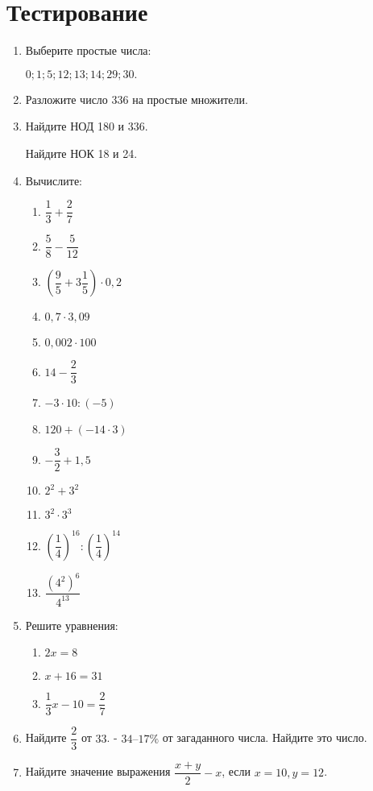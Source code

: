 \documentclass[12pt, a4paper]{article}
\begin{document}
	
	\section*{Тестирование}
	\begin{enumerate}
		\item Выберите простые числа:
		
		$0; 1; 5; 12; 13; 14; 29; 30. $
		\item Разложите число 336 на простые множители.
		\item Найдите НОД 180 и 336.
		
		Найдите НОК 18 и 24.
		\item Вычислите:
		\begin{multicols}{2}
			\begin{enumerate}[label=\asbuk*)]
				\item $\dfrac{1}{3}+\dfrac{2}{7}$
				\item $\dfrac{5}{8}-\dfrac{5}{12}$
				\item $\left( \dfrac{9}{5}+3\dfrac{1}{5}\right) \cdot 0,2$ 
				\item $0,7 \cdot 3,09$
				\item $0,002 \cdot 100$
				\item $14-\dfrac{2}{3}$
				\item $-3\cdot 10 : (-5)$
				\item $120+(-14 \cdot 3)$
				\item $-\dfrac{3}{2}+1,5$
				\item $2^2+3^2$
				\item $3^2\cdot 3^3$
				\item $\left( \dfrac{1}{4}\right)^{16}:\left( \dfrac{1}{4}\right)^{14}$
				\item $\dfrac{(4^2)^6}{4^{13}}$
			\end{enumerate}
		\end{multicols}
		\item Решите уравнения:
			\begin{enumerate}[label=\asbuk*)]
				\item $2x=8$
				\item $x+16=31$
				\item $\dfrac{1}{3}x-10=\dfrac{2}{7}$ 
				\end{enumerate}
		\item \textit{}Найдите $\dfrac{2}{3}$ от $33$.
-		
		$34 – 17\%$ от загаданного числа. Найдите это число. 
		\item Найдите значение выражения $\dfrac{x+y}{2}-x$, если $x=10, y=12$.

\end{enumerate}
\end{document}
